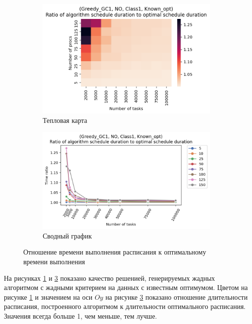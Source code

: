 \begin{figure}[!htbp]
    \centering
    \begin{subfigure}{0.49\textwidth}
        \includegraphics[width=\textwidth]{imgs/ideal_1/NO/th.png}
        \caption{Тепловая карта}   
        \label{fig:NO-GC1-times-heatmap}
    \end{subfigure}
    \hfill
    \begin{subfigure}{0.49\textwidth}
        \includegraphics[width=\textwidth]{imgs/ideal_1/NO/gr_amalgamated.png}
        \caption{Сводный график}   
        \label{fig:NO-GC1-times-compiled} 
    \end{subfigure}
    \caption{Отношение времени выполнения расписания к оптимальному времени выполнения}
\end{figure}

На рисунках \ref{fig:NO-GC1-times-heatmap} и \ref{fig:NO-GC1-times-compiled} показано качество решенией, генерируемых жадных алгоритмом с жадными критерием на данных с известным оптимумом. Цветом на рисунке \ref{fig:NO-GC1-times-heatmap} и значением на оси $Oy$ на рисунке \ref{fig:NO-GC1-times-compiled} показано отношение длительности расписания, построенного алгоритмом к длительности оптимального расписания. Значения всегда больше 1, чем меньше, тем лучше.

